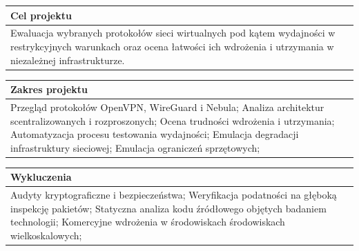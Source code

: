 \vspace{1em}

\begin{center}
    \begin{tabularx}{\textwidth}{|X|}
        \hline
        \parbox[c][2em][c]{\textwidth}{\textbf{Cel projektu}}
        \\\hline
        \parbox[c][5.5em][c]{0.95\textwidth}{
            Ewaluacja wybranych protokołów sieci wirtualnych pod kątem wydajności w restrykcyjnych warunkach oraz ocena łatwości ich wdrożenia i utrzymania w niezależnej infrastrukturze.
        }
        \\\hline
    \end{tabularx}
\end{center}

\vspace{1em}

\begin{center}
    \begin{tabularx}{\textwidth}{|X|}
        \hline
        \parbox[c][2em][c]{\textwidth}{\textbf{Zakres projektu}}
        \\\hline
        \parbox[c][6.5em][c]{0.95\textwidth}{
            Przegląd protokołów OpenVPN, WireGuard i Nebula; Analiza architektur scentralizowanych i rozproszonych; Ocena trudności wdrożenia i utrzymania; Automatyzacja procesu testowania wydajności; Emulacja degradacji infrastruktury sieciowej; Emulacja ograniczeń sprzętowych;
        }
        \\\hline
    \end{tabularx}
\end{center}

\vspace{1em}

\begin{center}
    \begin{tabularx}{\textwidth}{|X|}
        \hline
        \parbox[c][2em][c]{\textwidth}{\textbf{Wykluczenia}}
        \\\hline
        \parbox[c][5.5em][c]{0.95\textwidth}{
            Audyty kryptograficzne i bezpieczeństwa; Weryfikacja podatności na głęboką inspekcję pakietów; Statyczna analiza kodu źródłowego objętych badaniem technologii; Komercyjne wdrożenia w środowiskach środowiskach wielkoskalowych;
        }
        \\\hline
    \end{tabularx}
\end{center}

\normalsize
